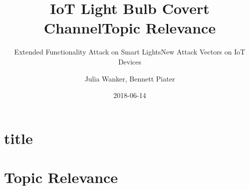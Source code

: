 \documentclass[11pt,t,usepdftitle=false,aspectratio=169]{beamer}
\title[IoT Light Bulb Attack]{IoT Light Bulb Covert Channel}
\subtitle{Extended Functionality Attack on Smart Lights}
\author[Julia Wanker \& Bennett Piater]{Julia Wanker, Bennett Piater}
\date{2018-06-14}
\begin{document}
	
\section{title}	




\title{Topic Relevance}
\subtitle{New Attack Vectors on IoT Devices}
\section{Topic Relevance} %
\label{sec:relevance}
\end{document}
